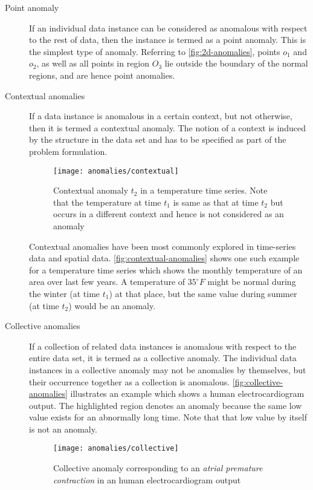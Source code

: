\begin{description}

\item[Point anomaly] If an individual data instance can be considered as
anomalous with respect to the rest of data, then the instance is termed as a
point anomaly. This is the simplest type of anomaly. Referring to
\autoref{fig:2d-anomalies}, points $o_1$ and $o_2$, as well as all points in
region $O_3$ lie outside the boundary of the normal regions, and are hence point
anomalies.

\item[Contextual anomalies] If a data instance is anomalous in a certain
context, but not otherwise, then it is termed a contextual anomaly. The notion
of a context is induced by the structure in the data set and has to be specified
as part of the problem formulation.

\begin{figure}
    \centering
    \texttt{[image: anomalies/contextual]}
    \caption[Contextual anomaly]{Contextual anomaly $t_2$ in a temperature time
        series. Note that the temperature at time $t_1$ is same as that at time
        $t_2$ but occurs in a different context and hence is not considered as
        an anomaly \cite{Chandola:2007}}
    \label{fig:contextual-anomalies}
\end{figure}

Contextual anomalies have been most commonly explored in time-series data and
spatial data. \autoref{fig:contextual-anomalies} shows one such example for a
temperature time series which shows the monthly temperature of an area over last
few years. A temperature of $35^\circ F$ might be normal during the winter (at
time $t_1$) at that place, but the same value during summer (at time $t_2$)
would be an anomaly.

\item[Collective anomalies] If a collection of related data instances is
anomalous with respect to the entire data set, it is termed as a collective
anomaly. The individual data instances in a collective anomaly may not be
anomalies by themselves, but their occurrence together as a collection is
anomalous. \autoref{fig:collective-anomalies} illustrates an example which shows
a human electrocardiogram output. The highlighted region denotes an anomaly
because the same low value exists for an abnormally long time. Note that that
low value by itself is not an anomaly.

\begin{figure}
    \centering
    \texttt{[image: anomalies/collective]}
    \caption[Collective anomaly]{Collective anomaly corresponding to an
        \emph{atrial premature contraction} in an human electrocardiogram output
        \cite{Goldberger:2000}}
    \label{fig:collective-anomalies}
\end{figure}

\end{description}

